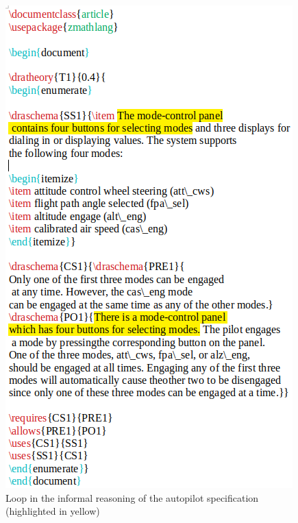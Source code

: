 \begin{figure}[H]
     \centering
     \begin{minipage}{0.45\textwidth}
     \centering
     \includegraphics[width=\linewidth]{Figures/fullexample/ifincorrectzdra.png}
     \caption{Loop in the informal reasoning of the autopilot specification (highlighted in yellow) \label{fig:ifzdraincorrect}}
     \end{minipage}\hfill
     \begin{minipage}{0.45\textwidth}
     \centering

\end{minipage}
\end{figure}
